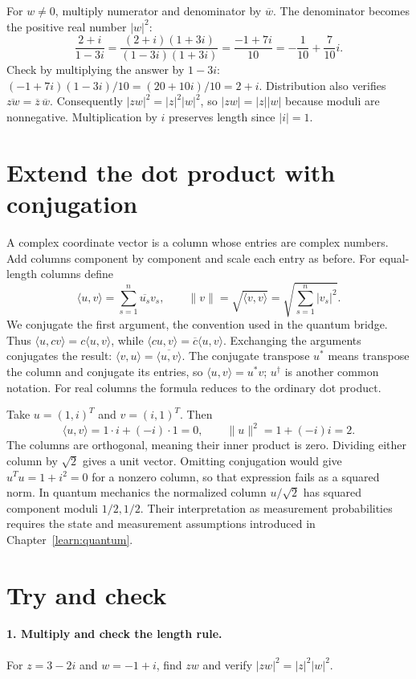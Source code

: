 For $w\ne0$, multiply numerator and denominator by $\overline w$.
The denominator becomes the positive real number $|w|^2$:
\[
 \frac{2+i}{1-3i}
 =\frac{(2+i)(1+3i)}{(1-3i)(1+3i)}
 =\frac{-1+7i}{10}=-\frac1{10}+\frac7{10}i.
\]
Check by multiplying the answer by $1-3i$:
$(-1+7i)(1-3i)/10=(20+10i)/10=2+i$.
Distribution also verifies $\overline{zw}=\overline z\,\overline w$.
Consequently $|zw|^2=|z|^2|w|^2$, so $|zw|=|z||w|$ because
moduli are nonnegative. Multiplication by $i$ preserves length since $|i|=1$.

\section{Extend the dot product with conjugation}
A complex coordinate vector is a column whose entries are complex numbers.
Add columns component by component and scale each entry as before. For
equal-length columns define
\[
 \langle u,v\rangle=\sum_{s=1}^n\overline{u_s}v_s,
 \qquad \|v\|=\sqrt{\langle v,v\rangle}
 =\sqrt{\sum_{s=1}^n |v_s|^2}.
\]
We conjugate the first argument, the convention used in the quantum bridge.
Thus $\langle u,cv\rangle=c\langle u,v\rangle$, while
$\langle cu,v\rangle=\overline c\langle u,v\rangle$.
Exchanging the arguments conjugates the result:
$\langle v,u\rangle=\overline{\langle u,v\rangle}$.
The conjugate transpose $u^*$ means transpose the column and conjugate
its entries, so $\langle u,v\rangle=u^*v$; $u^\dagger$ is another common
notation. For real columns the formula reduces to the ordinary dot product.

Take $u=(1,i)^T$ and $v=(i,1)^T$. Then
\[
 \langle u,v\rangle=1\cdot i+(-i)\cdot1=0,\qquad
 \|u\|^2=1+(-i)i=2.
\]
The columns are orthogonal, meaning their inner product is zero.
Dividing either column by $\sqrt2$ gives a unit vector. Omitting conjugation
would give $u^Tu=1+i^2=0$ for a nonzero column, so that expression fails
as a squared norm. In quantum mechanics the normalized column
$u/\sqrt2$ has squared component moduli $1/2,1/2$. Their interpretation as
measurement probabilities requires the state and measurement assumptions
introduced in Chapter~\ref{learn:quantum}.

\section{Try and check}
\paragraph{1. Multiply and check the length rule.}
For $z=3-2i$ and $w=-1+i$, find $zw$ and verify $|zw|^2=|z|^2|w|^2$.
